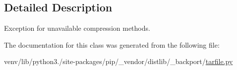 \subsection{Detailed Description}
\begin{DoxyVerb}Exception for unavailable compression methods.\end{DoxyVerb}
 

The documentation for this class was generated from the following file\+:\begin{DoxyCompactItemize}
\item 
venv/lib/python3./site-\/packages/pip/\+\_\+vendor/distlib/\+\_\+backport/\hyperlink{tarfile_8py}{tarfile.\+py}\end{DoxyCompactItemize}
